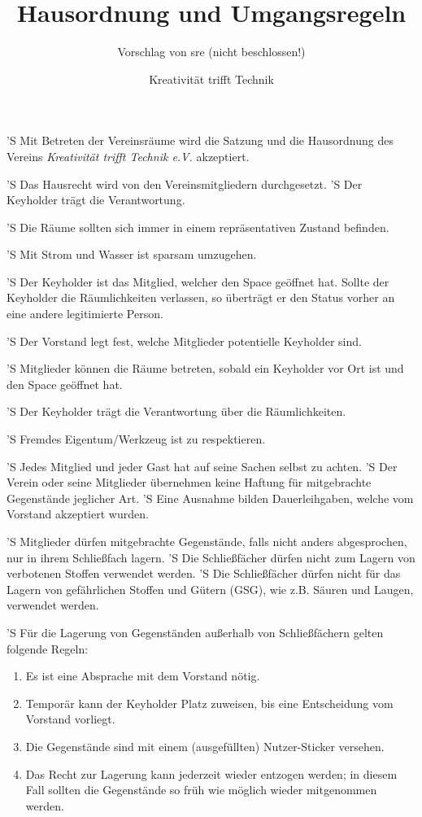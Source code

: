 \documentclass[a4paper,10pt]{scrreprt}
\begin{document}
\title{Hausordnung und Umgangsregeln}
\subtitle{Vorschlag von sre (nicht beschlossen!)}
\author{Kreativität trifft Technik}



\begin{contract}


'S Mit Betreten der Vereinsräume wird die Satzung und die Hausordnung des
Vereins \textit{Kreativität trifft Technik e.V.} akzeptiert.

'S Das Hausrecht wird von den Vereinsmitgliedern durchgesetzt.
'S Der Keyholder trägt die Verantwortung.

'S Die Räume sollten sich immer in einem repräsentativen Zustand befinden.

'S Mit Strom und Wasser ist sparsam umzugehen.


'S Der Keyholder ist das Mitglied, welcher den Space geöffnet hat. Sollte der
Keyholder die Räumlichkeiten verlassen, so überträgt er den Status vorher an
eine andere legitimierte Person.

'S Der Vorstand legt fest, welche Mitglieder potentielle Keyholder sind.

'S Mitglieder können die Räume betreten, sobald ein Keyholder vor Ort ist
und den Space geöffnet hat.

'S Der Keyholder trägt die Verantwortung über die Räumlichkeiten.


'S Fremdes Eigentum/Werkzeug ist zu respektieren.

'S Jedes Mitglied und jeder Gast hat auf seine Sachen selbst zu achten.
'S Der Verein oder seine Mitglieder übernehmen keine Haftung für mitgebrachte
Gegenstände jeglicher Art.
'S Eine Ausnahme bilden Dauerleihgaben, welche vom Vorstand akzeptiert wurden.

'S Mitglieder dürfen mitgebrachte Gegenstände, falls nicht anders abgesprochen,
nur in ihrem Schließfach lagern.
'S Die Schließfächer dürfen nicht zum Lagern von verbotenen Stoffen verwendet
werden.
'S Die Schließfächer dürfen nicht für das Lagern von gefährlichen Stoffen und
Gütern (GSG), wie z.B. Säuren und Laugen, verwendet werden.

'S Für die Lagerung von Gegenständen außerhalb von Schließfächern gelten folgende
Regeln:
\begin{enumerate}
	\item Es ist eine Absprache mit dem Vorstand nötig.
	\item Temporär kann der Keyholder Platz zuweisen, bis eine Entscheidung
	vom Vorstand vorliegt.
	\item Die Gegenstände sind mit einem (ausgefüllten) Nutzer-Sticker versehen.
	\item Das Recht zur Lagerung kann jederzeit wieder entzogen werden; in diesem
	Fall sollten die Gegenstände so früh wie möglich wieder mitgenommen werden.
\end{enumerate}


\end{contract}
\end{document}
